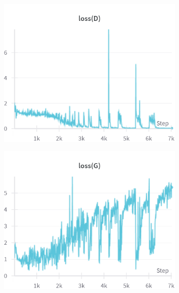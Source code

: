 \begin{figure}[H]
    \centering

    \begin{subfigure}{0.45\textwidth}
        \centering
        \includegraphics[width=0.95\linewidth]{ngf/128/lossD.png}
        \caption{}
        \label{subfig:ngf/128/lossD}
    \end{subfigure}%
    \begin{subfigure}{0.45\textwidth}
        \centering
        \includegraphics[width=0.95\linewidth]{ngf/128/lossG.png}
        \caption{}
        \label{subfig:ngf/128/lossG}
    \end{subfigure}


\end{figure}
